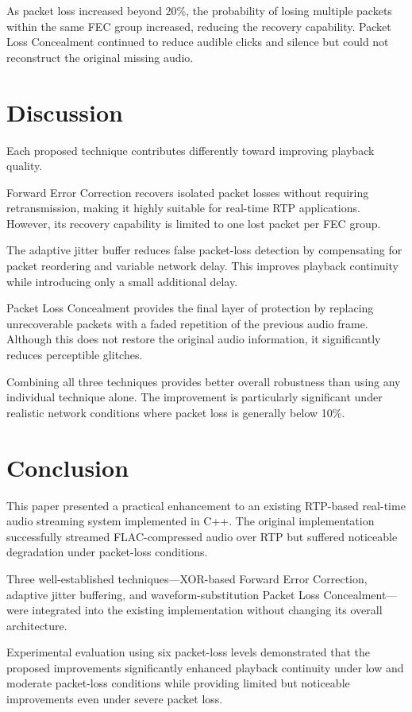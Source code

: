 \documentclass[conference]{IEEEtran}
\begin{document}
As packet loss increased beyond 20\%, the probability of losing multiple packets within the same FEC group increased, reducing the recovery capability. Packet Loss Concealment continued to reduce audible clicks and silence but could not reconstruct the original missing audio.

\section{Discussion}

Each proposed technique contributes differently toward improving playback quality.

Forward Error Correction recovers isolated packet losses without requiring retransmission, making it highly suitable for real-time RTP applications. However, its recovery capability is limited to one lost packet per FEC group.

The adaptive jitter buffer reduces false packet-loss detection by compensating for packet reordering and variable network delay. This improves playback continuity while introducing only a small additional delay.

Packet Loss Concealment provides the final layer of protection by replacing unrecoverable packets with a faded repetition of the previous audio frame. Although this does not restore the original audio information, it significantly reduces perceptible glitches.

Combining all three techniques provides better overall robustness than using any individual technique alone. The improvement is particularly significant under realistic network conditions where packet loss is generally below 10\%.

\section{Conclusion}

This paper presented a practical enhancement to an existing RTP-based real-time audio streaming system implemented in C++. The original implementation successfully streamed FLAC-compressed audio over RTP but suffered noticeable degradation under packet-loss conditions.

Three well-established techniques—XOR-based Forward Error Correction, adaptive jitter buffering, and waveform-substitution Packet Loss Concealment—were integrated into the existing implementation without changing its overall architecture.

Experimental evaluation using six packet-loss levels demonstrated that the proposed improvements significantly enhanced playback continuity under low and moderate packet-loss conditions while providing limited but noticeable improvements even under severe packet loss.
\end{document}
